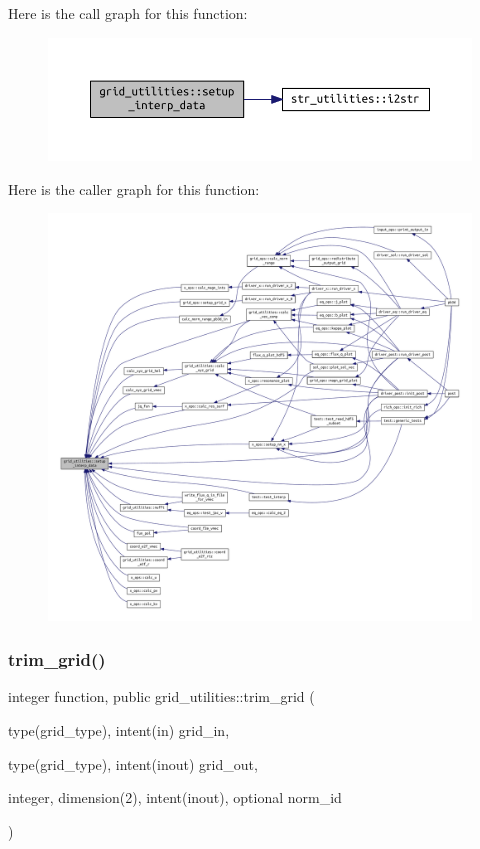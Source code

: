 Here is the call graph for this function\+:
\nopagebreak
\begin{figure}[H]
\begin{center}
\leavevmode
\includegraphics[width=350pt]{namespacegrid__utilities_a43206328f85253a6cc821cd46a498bb6_cgraph}
\end{center}
\end{figure}
Here is the caller graph for this function\+:
\nopagebreak
\begin{figure}[H]
\begin{center}
\leavevmode
\includegraphics[width=350pt]{namespacegrid__utilities_a43206328f85253a6cc821cd46a498bb6_icgraph}
\end{center}
\end{figure}
\mbox{\label{namespacegrid__utilities_a67001ff9bbcad707aacf17f90a748d90}} 
\subsubsection{\texorpdfstring{trim\+\_\+grid()}{trim\_grid()}}
{\footnotesize\ttfamily integer function, public grid\+\_\+utilities\+::trim\+\_\+grid (\begin{DoxyParamCaption}\item[{type(grid\+\_\+type), intent(in)}]{grid\+\_\+in,  }\item[{type(grid\+\_\+type), intent(inout)}]{grid\+\_\+out,  }\item[{integer, dimension(2), intent(inout), optional}]{norm\+\_\+id }\end{DoxyParamCaption})}



